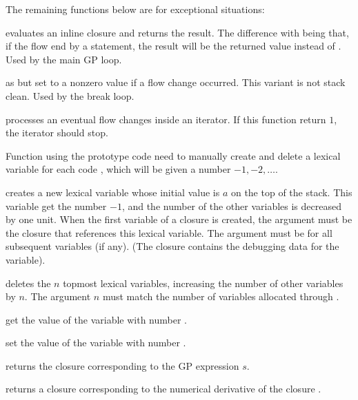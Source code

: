 The remaining functions below are for exceptional situations:

 evaluates an inline closure and returns
the result. The difference with  being that, if the flow end by a
 statement, the result will be the returned value instead of
. Used by the main GP loop.

 as 
but set  to a nonzero value if a flow change occurred. This
variant is not stack clean. Used by the break loop.


 processes an eventual flow changes inside an
iterator. If this function return $1$, the iterator should stop.

\label{se:pushlex}

Function using the prototype code  need to manually create and delete a
lexical variable for each code , which will be given a number $-1, -2,
\ldots$.

 creates a new lexical variable whose
initial value is $a$ on the top of the stack. This variable get the number
$-1$, and the number of the other variables is decreased by one unit. When
the first variable of a closure is created, the argument  must be the
closure that references this lexical variable. The argument  must be
 for all subsequent variables (if any).  (The closure contains the
debugging data for the variable).

 deletes the $n$ topmost lexical variables,
increasing the number of other variables by $n$. The argument $n$ must match
the number of variables allocated through .

 get the value of the variable with number .

 set the value of the variable with number
.


 returns the closure corresponding to the
GP expression $s$.

 returns a closure corresponding to the
numerical derivative of the closure .

